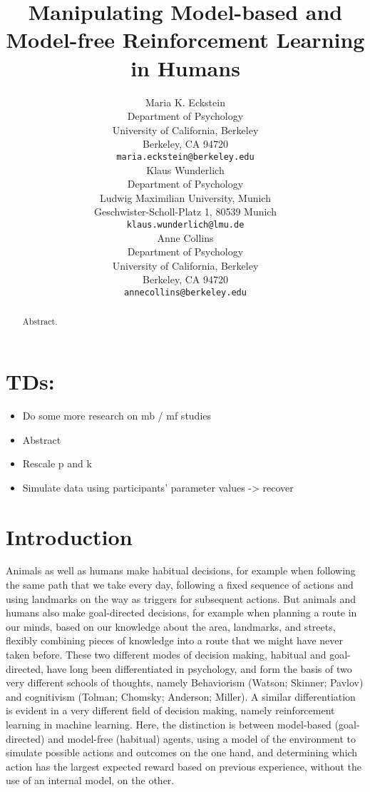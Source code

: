 \documentclass[11pt]{article} %
\title{Manipulating Model-based and Model-free Reinforcement Learning in Humans}
\author{
Maria K. Eckstein \\
Department of Psychology \\
University of California, Berkeley \\
Berkeley, CA 94720 \\
\texttt{maria.eckstein@berkeley.edu} \\
\And
Klaus Wunderlich \\
Department of Psychology \\
Ludwig Maximilian University, Munich \\
Geschwister-Scholl-Platz 1, 80539 Munich \\
\texttt{klaus.wunderlich@lmu.de} \\
\And
Anne Collins \\
Department of Psychology\\
University of California, Berkeley \\
Berkeley, CA 94720  \\
\texttt{annecollins@berkeley.edu} \\
}
\begin{document}
\maketitle

\begin{abstract}
Abstract. 
\end{abstract}




\section*{TDs:}
\begin{itemize}
	\item Do some more research on mb / mf studies
	\item Abstract
	\item Rescale p and k
	\item Simulate data using participants' parameter values -> recover
\end{itemize}

\startmain

\section{Introduction}

Animals as well as humans make habitual decisions, for example when following the same path that we take every day, following a fixed sequence of actions and using landmarks on the way as triggers for subsequent actions. But animals and humans also make goal-directed decisions, for example when planning a route in our minds, based on our knowledge about the area, landmarks, and streets, flexibly combining pieces of knowledge into a route that we might have never taken before. These two different modes of decision making, habitual and goal-directed, have long been differentiated in psychology, and form the basis of two very different schools of thoughts, namely Behaviorism (Watson; Skinner; Pavlov) and cognitivism (Tolman; Chomsky; Anderson; Miller). A similar differentiation is evident in a very different field of decision making, namely reinforcement learning in machine learning. Here, the distinction is between model-based (goal-directed) and model-free (habitual) agents, using a model of the environment to simulate possible actions and outcomes on the one hand, and determining which action has the largest expected reward based on previous experience, without the use of an internal model, on the other. 
\end{document}
